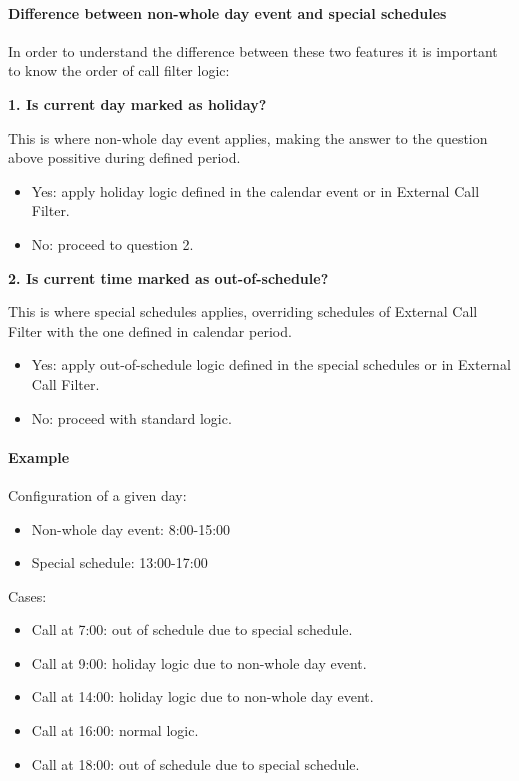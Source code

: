 \documentclass[letterpaper,10pt,spanish]{sphinxmanual}
\begin{document}
\paragraph{Difference between non-whole day event and special schedules}
\label{administration_portal/client/vpbx/routing_tools/calendars:difference-between-non-whole-day-event-and-special-schedules}
In order to understand the difference between these two features it is important to know the order of call filter logic:

\textbf{1. Is current day marked as holiday?}

This is where non-whole day event applies, making the answer to the question above possitive during defined period.
\begin{itemize}
\item {} 
Yes: apply holiday logic defined in the calendar event or in External Call Filter.

\item {} 
No: proceed to question 2.

\end{itemize}

\textbf{2. Is current time marked as out-of-schedule?}

This is where special schedules applies, overriding schedules of External Call Filter with the one defined in calendar
period.
\begin{itemize}
\item {} 
Yes: apply out-of-schedule logic defined in the special schedules or in External Call Filter.

\item {} 
No: proceed with standard logic.

\end{itemize}
\paragraph{Example}

Configuration of a given day:
\begin{itemize}
\item {} 
Non-whole day event: 8:00-15:00

\item {} 
Special schedule: 13:00-17:00

\end{itemize}

Cases:
\begin{itemize}
\item {} 
Call at 7:00: out of schedule due to special schedule.

\item {} 
Call at 9:00: holiday logic due to non-whole day event.

\item {} 
Call at 14:00: holiday logic due to non-whole day event.

\item {} 
Call at 16:00: normal logic.

\item {} 
Call at 18:00: out of schedule due to special schedule.

\end{itemize}
\end{document}
